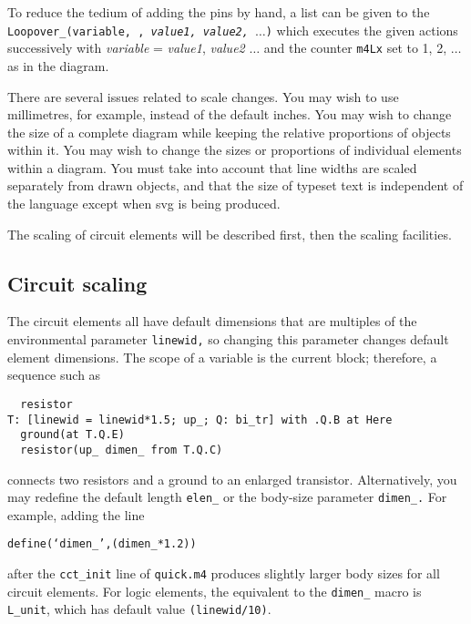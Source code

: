 To reduce the tedium of adding the pins by hand, a list
can be given to the
{\tt Loopover\_(variable,
,
{\sl value1, value2, $\ldots$})}
which executes the given actions successively with
 {\sl variable} = {\sl value1}, {\sl value2} $\ldots$ and the
 counter {\tt m4Lx} set to 1, 2, $\ldots$ as in the diagram.


There are several issues related to scale changes.  You may wish to use
millimetres, for example, instead of the default inches.  You may wish
to change the size of a complete diagram while keeping the relative
proportions of objects within it.  You may wish to change the sizes or
proportions of individual elements within a diagram.  You must take
into account that line widths are scaled separately from drawn objects,
and that the size of typeset text is independent of the \pic language
except when svg is being produced.

The scaling of circuit elements will be described first, then
the \pic scaling facilities.

\subsection{Circuit scaling\label{Circuitscaling:}}
The circuit elements all have default dimensions
that are multiples of the \pic environmental parameter {\tt linewid,}
so changing this parameter changes default element dimensions.
The scope of a \pic variable is the current block; therefore, a sequence
such as

\begin{verbatim}
  resistor
T: [linewid = linewid*1.5; up_; Q: bi_tr] with .Q.B at Here
  ground(at T.Q.E)
  resistor(up_ dimen_ from T.Q.C)
\end{verbatim}

\noindent%
connects two resistors and a ground to an enlarged transistor.
Alternatively, you may redefine the default length {\tt elen\_}
or the body-size parameter {\tt dimen\_.}  For example, adding the line

{\tt define(`dimen\_',(dimen\_*1.2))}

\noindent%
after the {\tt cct\_init} line of {\tt quick.m4} produces slightly
larger body sizes for all circuit elements.  For logic elements, the
equivalent to the {\tt dimen\_} macro is {\tt L\_unit}, which has
default value {\tt (linewid/10)}.

